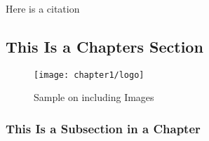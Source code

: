 
\lipsum[10-10]

Here is a citation \cite{IndustEclog}

\subsection{This Is a Chapters Section} %

\begin{figure}[!ht]
	\centering
	\texttt{[image: chapter1/logo]}
	\label{fig:sales}\caption{Sample on including Images}
\end{figure}

\lipsum[12-15]

\subsubsection{This Is a Subsection in a Chapter} %

\lipsum[16-20]





  




